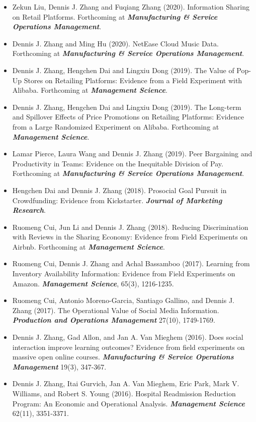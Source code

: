 \documentclass[10pt]{article}
\begin{document}
\begin{itemize}
    \item Zekun Liu, Dennis J. Zhang and Fuqiang Zhang (2020). Information Sharing on Retail Platforms. Forthcoming at \emph{\bf Manufacturing \& Service Operations Management}.

    \item Dennis J. Zhang and Ming Hu (2020). NetEase Cloud Music Data.  Forthcoming at \emph{\bf Manufacturing \& Service Operations Management}.

    \item Dennis J. Zhang, Hengchen Dai and Lingxiu Dong (2019). The Value of Pop-Up Stores on Retailing Platforms: Evidence from a Field Experiment with Alibaba. Forthcoming at \emph{\bf Management Science}.
    
    \item Dennis J. Zhang, Hengchen Dai and Lingxiu Dong (2019). The Long-term and Spillover Effects of Price Promotions on Retailing Platforms: Evidence from a Large Randomized Experiment on Alibaba. Forthcoming at \emph{\bf Management Science}.

    \item Lamar Pierce, Laura Wang and Dennis J. Zhang (2019). Peer Bargaining and Productivity in Teams: Evidence on the Inequitable Division of Pay. Forthcoming at \emph{\bf Manufacturing \& Service Operations Management}.

    \item Hengchen Dai and Dennis J. Zhang (2018). Prosocial Goal Pursuit in Crowdfunding: Evidence from Kickstarter. \emph{\bf Journal of Marketing Research}.

    \item Ruomeng Cui, Jun Li and Dennis J. Zhang (2018). Reducing Discrimination with Reviews in the Sharing Economy: Evidence from Field Experiments on Airbnb. Forthcoming at \emph{\bf Management Science}.

    \item Ruomeng Cui, Dennis J. Zhang and Achal Bassamboo (2017). Learning from Inventory Availability Information: Evidence from Field Experiments on Amazon. \emph{\bf Management Science}, 65(3), 1216-1235.

    \item Ruomeng Cui, Antonio Moreno-Garcia, Santiago Gallino, and Dennis J. Zhang (2017). The Operational Value of Social Media Information. \emph{\bf Production and Operations Management} 27(10), 1749-1769.

    \item Dennis J. Zhang, Gad Allon, and Jan A. Van Mieghem (2016). Does social interaction improve learning outcomes? Evidence from field experiments on massive open online courses. \emph{\bf Manufacturing \& Service Operations Management} 19(3), 347-367.
  
    \item Dennis J. Zhang, Itai Gurvich, Jan A. Van Mieghem, Eric Park, Mark V. Williams, and Robert S. Young (2016). Hospital Readmission Reduction Program: An Economic and Operational Analysis. \emph{\bf Management Science} 62(11), 3351-3371.

\end{itemize}
\end{document}
